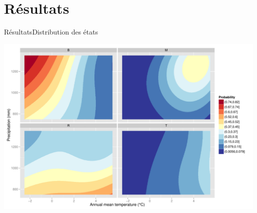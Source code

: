 \documentclass[10pt,aspectratio=149]{beamer}
\begin{document}
\section{Résultats}



   \begin{frame}{Résultats}{Distribution des états}
            \begin{center}
               \includegraphics[height=0.7\textheight]{Figs/SDM_climate_space}
           \end{center}
   \end{frame}

\end{document}
